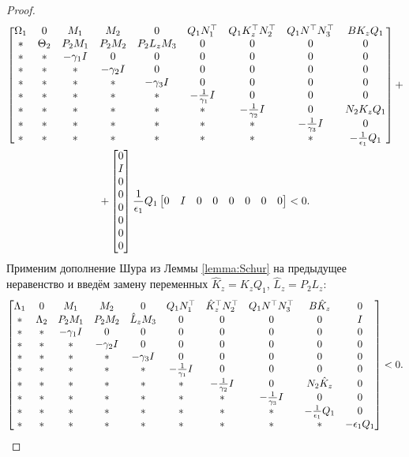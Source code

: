 \begin{proof}
		\begin{multline}
		\label{eq:after_Young_2}
		\begin{bmatrix}
			{\Omega}_1 & 0 & {M}_1 & {M}_2 & 0& {Q}_1{N}_1^\top & {Q}_1{K}_z^\top{N}_2^\top & {Q}_1 {N}^\top{N}_3^\top & B K_z Q_1
			\\
			* & {\Theta}_2 & {P}_2{M}_1 & {P}_2{M}_2 & {P}_2{L}_z{M}_3 & 0 & 0 & 0 & 0\\
			* & * & -\gamma_1{I} & 0&0&0&0&0& 0\\
			* & * & * & -\gamma_2{I}&0&0&0&0& 0\\
			* & * & * & *&-\gamma_3{I}&0&0&0& 0\\
			* & * & * & *&*&-\frac{1}{\gamma_1}{I}&0&0& 0\\
			* & * & * & *&*&*&-\frac{1}{\gamma_2}{I}&0&N_2 K_z Q_1\\
			*&* & * & * & *&*&*&-\frac{1}{\gamma_3}{I}& 0\\
			*&* & * & * & *&*&*&* &-\frac{1}{\epsilon_1}{Q}_1
		\end{bmatrix}
		+
		\\
		+\begin{bmatrix}
			0 \\I\\0\\0\\0\\0\\0\\0
		\end{bmatrix}
		\frac{1}{\epsilon_1}{Q}_1
		\begin{bmatrix}
			0 & I & 0&0&0&0&0&0
		\end{bmatrix}
		<0.
	\end{multline}
	Применим дополнение Шура из Леммы {\ref{lemma:Schur}} на предыдущее неравенство и введём замену переменных $\hat{{K}}_z={K}_z{Q}_1$, $\hat{{L}}_z={P}_2{L}_z$: 
	\begin{equation}
		\label{eq:thm3_LMI_before_alpha_beta}
		\begin{bmatrix}
			{\Lambda}_1 & 0 & {M}_1 & {M}_2&0 & {Q}_1{N}_1^\top & \hat{{K}}_z^\top{N}_2^\top & {Q}_1 {N}^\top{N}_3^\top & {B}\hat{{K}}_z & 0\\
			* & {\Lambda}_2 & {P}_2{M}_1 & {P}_2{M}_2 & \hat{{L}}_z{M}_3& 0& 0&0&0&{I} \\
			* & * & -\gamma_1{I} & 0&0&0&0&0&0&0\\
			* & * &*  & -\gamma_2{I}&0&0&0&0&0&0\\
			*& * & * &*  & -\gamma_3{I}&0&0&0&0&0\\
			* &* & * & * & *&-\frac{1}{\gamma_1}{I}&0&0&0&0\\
			* & * & * &*& *&*&-\frac{1}{\gamma_2}{I}& 0&{N}_2\hat{{K}}_z&0\\
			*&*&* &* & * & * & *&-\frac{1}{\gamma_3}{I}&0&0\\
			* & * & *&*&* & *&*&*&-\frac{1}{\epsilon_1}{Q}_1&0\\
			* & * & * & *&*&*&*&*&*&-\epsilon_1{Q}_1\\
		\end{bmatrix}<0.
	\end{equation}
	

\end{proof}
